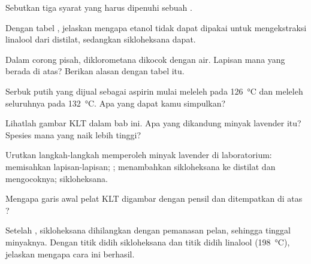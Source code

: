 \begin{exercise}[$\star$]\label{exo:g10:chemical-species:5}
Sebutkan tiga syarat yang harus dipenuhi sebuah  .
\end{exercise}

\begin{exercise}[$\star\star$]\label{exo:g10:chemical-species:6}
Dengan tabel , jelaskan mengapa etanol tidak dapat dipakai untuk
mengekstraksi linalool dari distilat, sedangkan sikloheksana dapat.
\end{exercise}

\begin{exercise}[$\star\star$]\label{exo:g10:chemical-species:7}
Dalam corong pisah, diklorometana dikocok dengan air. Lapisan mana yang
berada di atas? Berikan alasan dengan tabel itu.
\end{exercise}

\begin{exercise}[$\star\star$]\label{exo:g10:chemical-species:8}
Serbuk putih yang dijual sebagai aspirin mulai meleleh pada
\qty{126}{\celsius} dan meleleh seluruhnya pada \qty{132}{\celsius}.
Apa yang dapat kamu simpulkan?
\end{exercise}

\begin{exercise}[$\star\star$]\label{exo:g10:chemical-species:9}
Lihatlah gambar KLT dalam bab ini. Apa yang dikandung minyak lavender
itu? Spesies mana yang naik lebih tinggi?
\end{exercise}

\begin{exercise}[$\star\star$]\label{exo:g10:chemical-species:10}
Urutkan langkah-langkah memperoleh minyak lavender di laboratorium:
memisahkan lapisan-lapisan; ; menambahkan sikloheksana ke
distilat dan mengocoknya;  sikloheksana.
\end{exercise}

\begin{exercise}[$\star\star$]\label{exo:g10:chemical-species:11}
Mengapa garis awal pelat KLT digambar dengan pensil dan ditempatkan di
atas ?
\end{exercise}

\begin{exercise}[$\star\star\star$]\label{exo:g10:chemical-species:12}
Setelah , sikloheksana dihilangkan dengan pemanasan pelan,
sehingga tinggal minyaknya. Dengan titik didih sikloheksana dan titik
didih linalool (\qty{198}{\celsius}), jelaskan mengapa cara ini berhasil.
\end{exercise}

